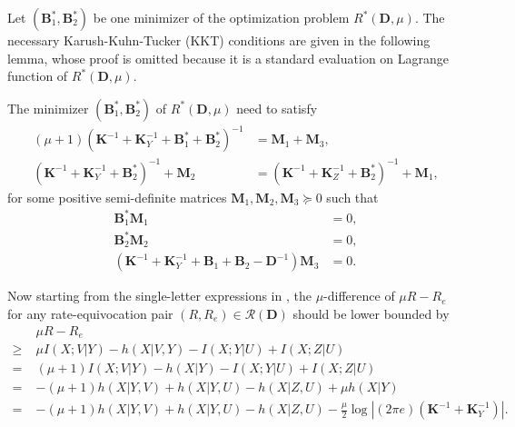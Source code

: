 \documentclass[journal,final, onecolumn]{IEEEtran}
\begin{document}
Let $(\boldsymbol{B}_{1}^{*},\boldsymbol{B}_{2}^{*})$ be one minimizer of the optimization problem $R^{*}({\boldsymbol{D}}, \mu)$. The necessary Karush-Kuhn-Tucker (KKT) conditions are given in the following lemma, whose proof is omitted because it is a standard evaluation on Lagrange function of $R^{*}({\boldsymbol{D}}, \mu)$.
\begin{lemma} \label{lemma_KKT} The minimizer $(\boldsymbol{B}_{1}^{*},\boldsymbol{B}_{2}^{*})$ of $R^{*}({\boldsymbol{D}}, \mu)$ need to satisfy
\begin{align}
(\mu+1) \left(\boldsymbol{K}^{-1} + \boldsymbol{K}_{Y}^{-1} + \boldsymbol{B}_{1}^{*}+ \boldsymbol{B}_{2}^{*} \right)^{-1} &= \boldsymbol{M}_{1} + \boldsymbol{M}_{3}, \label{eq:KKT1}\\
\left(\boldsymbol{K}^{-1} + \boldsymbol{K}_{Y}^{-1} + \boldsymbol{B}_{2}^{*} \right)^{-1} + \boldsymbol{M}_{2} &= \left(\boldsymbol{K}^{-1} + \boldsymbol{K}_{Z}^{-1} + \boldsymbol{B}_{2}^{*} \right)^{-1} + \boldsymbol{M}_{1}, \label{eq:KKT2}
\end{align}
for some positive semi-definite matrices $\boldsymbol{M}_{1}, \boldsymbol{M}_{2}, \boldsymbol{M}_{3} \succeq0$ such that
\begin{align}
\boldsymbol{B}_{1}^{*} \boldsymbol{M}_{1} &=0, \label{eq:KKT3}\\
\boldsymbol{B}_{2}^{*} \boldsymbol{M}_{2}&=0, \label{eq:KKT4}\\
\left(\boldsymbol{K}^{-1} + \boldsymbol{K}^{-1}_{Y}+\boldsymbol{B}_{1}+\boldsymbol{B}_{2} - \boldsymbol{D}^{-1}\right) \boldsymbol{M}_3&=0 \label{eq:KKT5}.
\end{align}
\end{lemma}

Now starting from the single-letter expressions in \cite[Theroem 3]{Villard13}, the $\mu$-difference of $\mu R- R_{e}$ for any rate-equivocation pair $(R, R_{e}) \in \mathcal{R}({\boldsymbol{D}})$ should be lower bounded by
\begin{align}
& \mu R- R_{e} \nonumber \\
\geq \;& \mu I({X}; V | {Y}) - h({X} | V,{Y})- I({X}; {Y}| U)+ I({X};{Z}|U) \\
=\; & (\mu+1) I({X}; V| {Y}) - h({X} | {Y})- I({X}; {Y}| U) + I({X};{Z}|U) \\
=\; & -(\mu+1)h(X|Y,V)+h(X|Y,U)-h(X|Z,U)+\mu h(X|Y)\\
=\; & -(\mu+1)h(X|Y,V)+h(X|Y,U)-h(X|Z,U)-\frac{\mu}{2}\log \left|   (2 \pi e) \left(\boldsymbol{K}^{-1} +\boldsymbol{K}_{Y}^{-1}\right)   \right|. \label{eqn:lb}
\end{align}
\end{document}

